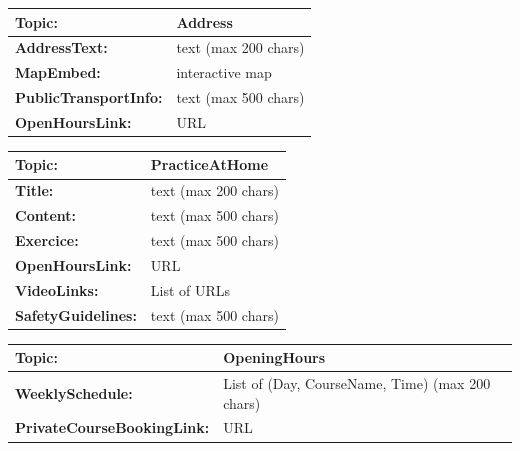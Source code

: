 \documentclass{article}
\begin{document}
\begin{center}
        \begin{tabularx}{\textwidth}{|>{\bfseries}l|X|}
                \hline
                Topic: & \textbf{Address} \\
                \hline
                AddressText: & text  (max 200 chars)\\
                \hline
                MapEmbed: & interactive map \\
                \hline
                PublicTransportInfo: & text (max 500 chars)\\
                \hline
                OpenHoursLink: & URL \\
                \hline

        \end{tabularx}
        \caption{Table: History}
\end{center}

\begin{center}
        \begin{tabularx}{\textwidth}{|>{\bfseries}l|X|}
                \hline
                Topic: & \textbf{PracticeAtHome} \\
                \hline
                Title: & text  (max 200 chars)\\
                \hline
                Content: & text (max 500 chars) \\
                \hline
                Exercice: & text (max 500 chars)\\
                \hline
                OpenHoursLink: & URL \\
                \hline
                VideoLinks: & List of URLs \\
                \hline
                SafetyGuidelines: & text (max 500 chars) \\
                \hline


        \end{tabularx}
        \caption{Table: Practice at home}
\end{center}

\begin{center}
        \begin{tabularx}{\textwidth}{|>{\bfseries}l|X|}
                \hline
                Topic: & \textbf{OpeningHours} \\
                \hline
                WeeklySchedule: & List of {(Day, CourseName, Time)}  (max 200 chars)\\
                \hline
                PrivateCourseBookingLink: & URL \\
                \hline


        \end{tabularx}
        \caption{Table: Opening Hours}
\end{center}
\end{document}
